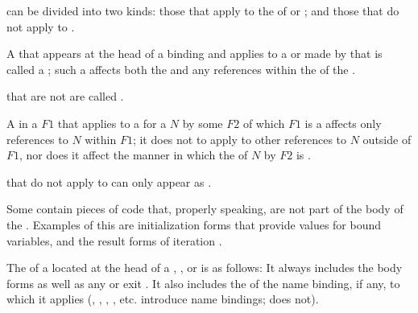  can be divided into two kinds: those that apply to the
 of  or ; and those that
do not apply to .

A  that appears at the head of a binding  
and applies to a  or   
made by that  is called a ; 
such a  affects both the  and
any references within the  of the .  

 that are not  are called
.

A  in a  $F1$ that applies to a 
for a  $N$  by some  $F2$
of which $F1$ is a 
affects only references to $N$ within $F1$; it does not to apply to
other references to $N$ outside of $F1$, nor does it affect the manner
in which the  of $N$ by $F2$ is .

 that do not apply to  can only appear 
as .


Some  contain pieces of code that, properly speaking,
are not part of the body of the .  Examples of this
are initialization forms that provide values for bound variables,
and the result forms of iteration .

 
The  of a  located at the head of 
a , , or  is as follows:
\beginlist
{}
It always includes the body forms as well as any  or exit .
It also includes the  of the name binding, if any, to which 
it applies (, ,  ,  , etc. 
introduce name bindings;  does not).
\endlist


